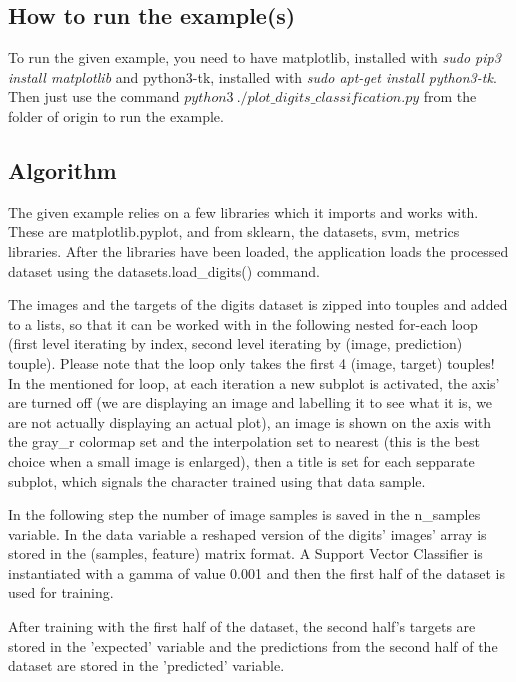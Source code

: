 \documentclass[a4paper,10pt]{report}
\begin{document}
 \subsection{How to run the example(s)}
 To run the given example, you need to have matplotlib, installed with \textit{sudo pip3 install matplotlib} and python3-tk, installed with \textit{sudo apt-get install python3-tk}. Then just use the command $python3\ ./plot\_digits\_classification.py$ from the folder of origin to run the example.
 
 \subsection{Algorithm}
 The given example relies on a few libraries which it imports and works with. These are matplotlib.pyplot, and from sklearn, the datasets, svm, metrics libraries. After the libraries have been loaded, the application loads the processed dataset using the datasets.load\_digits() command. 
 
 The images and the targets of the digits dataset is zipped into touples and added to a lists, so that it can be worked with in the following nested for-each loop (first level iterating by index, second level iterating by (image, prediction) touple). Please note that the loop only takes the first 4 (image, target) touples! In the mentioned for loop, at each iteration a new subplot is activated, the axis' are turned off (we are displaying an image and labelling it to see what it is, we are not actually displaying an actual plot), an image is shown on the axis with the gray\_r colormap set and the interpolation set to nearest (this is the best choice when a small image is enlarged), then a title is set for each sepparate subplot, which signals the character trained using that data sample.
 
 In the following step the number of image samples is saved in the n\_samples variable. In the data variable a reshaped version of the digits' images' array is stored in the (samples, feature) matrix format. A Support Vector Classifier is instantiated with a gamma of value 0.001 and then the first half of the dataset is used for training.
 
 After training with the first half of the dataset, the second half's targets are stored in the 'expected' variable and the predictions from the second half of the dataset are stored in the 'predicted' variable.
 
\end{document}
